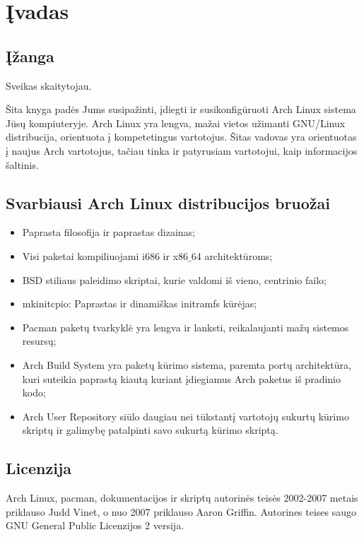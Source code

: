 \documentclass[a4paper]{book}
\begin{document}
\chapter{Įvadas}

  \section{Įžanga}

  Sveikas skaitytojau. 

  Šita knyga padės Jums susipažinti, įdiegti ir susikonfigūruoti
  Arch Linux sistema Jūsų kompiuteryje. Arch Linux yra lengva, mažai
  vietos užimanti GNU/Linux distribucija, orientuota į kompetetingus
  vartotojus. Šitas vadovas yra orientuotas į naujus Arch vartotojus,
  tačiau tinka ir patyrusiam vartotojui, kaip informacijos šaltinis.

  \section{Svarbiausi Arch Linux distribucijos bruožai}
  \begin{itemize}
    \item Paprasta filosofija ir paprastas dizainas;
    \item Visi paketai kompiliuojami i686 ir x86$\_$64 architektūroms;
    \item BSD stiliaus paleidimo skriptai, kurie valdomi iš vieno, centrinio failo;
    \item mkinitcpio: Paprastas ir dinamiškas initramfs kūrėjas;
    \item Pacman paketų tvarkyklė yra lengva ir lanksti, reikalaujanti mažų sistemos resursų;
    \item Arch Build System yra paketų kūrimo sistema, paremta portų
      architektūra, kuri suteikia paprastą kiautą kuriant įdiegiamus Arch
      paketus iš pradinio kodo;
    \item Arch User Repository siūlo daugiau nei tūkstantį vartotojų sukurtų
      kūrimo skriptų ir galimybę patalpinti savo sukurtą kūrimo
      skriptą.
  \end{itemize}

  \section{Licenzija}

  Arch Linux, pacman, dokumentacijos ir skriptų autorinės teisės
  2002-2007 metais priklauso Judd Vinet, o nuo 2007 priklauso Aaron
  Griffin. Autorines teises saugo GNU General Public Licenzijos 2
  versija.
\end{document}
